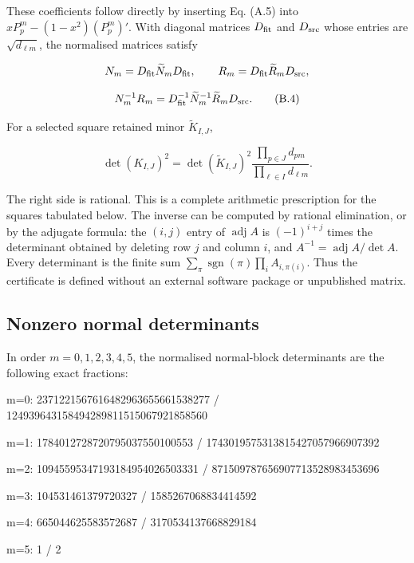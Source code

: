 \documentclass[
  11pt,
  a4paper]{article}
\newenvironment{Shaded}{}{}
\newcommand{\NormalTok}[1]{#1}
\begin{document}
These coefficients follow directly by inserting Eq. (A.5) into \(xP_p^m-(1-x^2)(P_p^m)'\). With diagonal matrices \(D_{\rm fit}\) and \(D_{\rm src}\) whose entries are \(\sqrt{d_{\ell m}}\), the normalised matrices satisfy

\[
N_m=D_{\rm fit}\widetilde N_mD_{\rm fit},\qquad
R_m=D_{\rm fit}\widetilde R_mD_{\rm src},
\]

\[
N_m^{-1}R_m
=D_{\rm fit}^{-1}\widetilde N_m^{-1}\widetilde R_mD_{\rm src}.
\tag{B.4}
\]

For a selected square retained minor \(\widetilde K_{I,J}\),

\[
\det(K_{I,J})^2
=\det(\widetilde K_{I,J})^2
\frac{\prod_{p\in J}d_{pm}}{\prod_{\ell\in I}d_{\ell m}}.
\tag{B.5}
\]

The right side is rational. This is a complete arithmetic prescription for the squares tabulated below. The inverse can be computed by rational elimination, or by the adjugate formula: the \((i,j)\) entry of \(\operatorname{adj}A\) is \((-1)^{i+j}\) times the determinant obtained by deleting row \(j\) and column \(i\), and \(A^{-1}=\operatorname{adj}A/\det A\). Every determinant is the finite sum \(\sum_\pi\operatorname{sgn}(\pi)\prod_iA_{i,\pi(i)}\). Thus the certificate is defined without an external software package or unpublished matrix.

\hypertarget{b.2-nonzero-normal-determinants}{%
\subsection{Nonzero normal determinants}\label{b.2-nonzero-normal-determinants}}

In order \(m=0,1,2,3,4,5\), the normalised normal-block determinants are the following exact fractions:

\begin{Shaded}
\begin{Highlighting}[]
\NormalTok{m=0:}
\NormalTok{2371221567616482963655661538277}
\NormalTok{/ 124939643158494289811515067921858560}

\NormalTok{m=1:}
\NormalTok{1784012728720795037550100553}
\NormalTok{/ 1743019575313815427057966907392}

\NormalTok{m=2:}
\NormalTok{10945595347193184954026503331}
\NormalTok{/ 871509787656907713528983453696}

\NormalTok{m=3:}
\NormalTok{104531461379720327}
\NormalTok{/ 1585267068834414592}

\NormalTok{m=4:}
\NormalTok{665044625583572687}
\NormalTok{/ 3170534137668829184}

\NormalTok{m=5:}
\NormalTok{1 / 2}
\end{Highlighting}
\end{Shaded}
\end{document}

